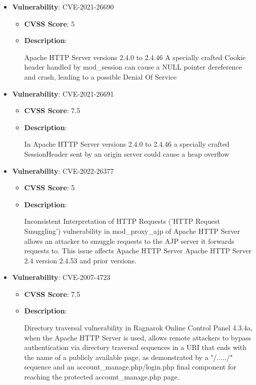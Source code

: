\documentclass{article}
\begin{document}
\begin{itemize}
        \item \textbf{Vulnerability}: CVE-2021-26690
        \begin{itemize}
            \item \textbf{CVSS Score}:  5 
            \item \textbf{Description}:
            \parbox[t]{0.9\linewidth}{
                \ttfamily Apache HTTP Server versions 2.4.0 to 2.4.46 A specially crafted Cookie header handled by mod\_session can cause a NULL pointer dereference and crash, leading to a possible Denial Of Service
            }
        \end{itemize}
    
        \item \textbf{Vulnerability}: CVE-2021-26691
        \begin{itemize}
            \item \textbf{CVSS Score}:  7.5 
            \item \textbf{Description}:
            \parbox[t]{0.9\linewidth}{
                \ttfamily In Apache HTTP Server versions 2.4.0 to 2.4.46 a specially crafted SessionHeader sent by an origin server could cause a heap overflow
            }
        \end{itemize}
    
        \item \textbf{Vulnerability}: CVE-2022-26377
        \begin{itemize}
            \item \textbf{CVSS Score}:  5 
            \item \textbf{Description}:
            \parbox[t]{0.9\linewidth}{
                \ttfamily Inconsistent Interpretation of HTTP Requests ('HTTP Request Smuggling') vulnerability in mod\_proxy\_ajp of Apache HTTP Server allows an attacker to smuggle requests to the AJP server it forwards requests to. This issue affects Apache HTTP Server Apache HTTP Server 2.4 version 2.4.53 and prior versions.
            }
        \end{itemize}
    
        \item \textbf{Vulnerability}: CVE-2007-4723
        \begin{itemize}
            \item \textbf{CVSS Score}:  7.5 
            \item \textbf{Description}:
            \parbox[t]{0.9\linewidth}{
                \ttfamily Directory traversal vulnerability in Ragnarok Online Control Panel 4.3.4a, when the Apache HTTP Server is used, allows remote attackers to bypass authentication via directory traversal sequences in a URI that ends with the name of a publicly available page, as demonstrated by a "/...../" sequence and an account\_manage.php/login.php final component for reaching the protected account\_manage.php page.
            }
        \end{itemize}
    

\end{itemize}
\end{document}
